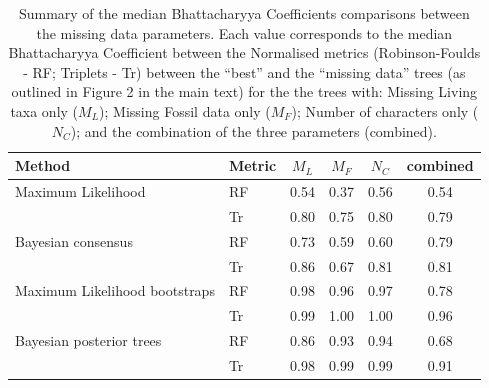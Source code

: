 \documentclass[12pt,letterpaper]{article}
\begin{document}
\begin{table}[ht]
\caption{Summary of the median Bhattacharyya Coefficients comparisons between the missing data parameters. Each value corresponds to the median Bhattacharyya Coefficient between the Normalised metrics (Robinson-Foulds - RF; Triplets - Tr) between the ``best'' and the ``missing data'' trees (as outlined in Figure 2 in the main text) for the the trees with: Missing Living taxa only ($M_L$); Missing Fossil data only ($M_F$); Number of characters only ($N_C$); and the combination of the three parameters (combined).} 
\begin{tabular}{llcccc}  
  \hline
 Method & Metric & $M_L$ & $M_F$ & $N_C$ & combined \\ 
  \hline
Maximum Likelihood & RF & 0.54 & 0.37 & 0.56 & 0.54 \\ 
                   & Tr & 0.80 & 0.75 & 0.80 & 0.79 \\ 
Bayesian consensus & RF & 0.73 & 0.59 & 0.60 & 0.79 \\ 
   & Tr & 0.86 & 0.67 & 0.81 & 0.81 \\ 
Maximum Likelihood bootstraps & RF & 0.98 & 0.96 & 0.97 & 0.78 \\ 
   & Tr & 0.99 & 1.00 & 1.00 & 0.96 \\ 
Bayesian posterior trees & RF & 0.86 & 0.93 & 0.94 & 0.68 \\ 
  & Tr & 0.98 & 0.99 & 0.99 & 0.91 \\ 
 \hline
\end{tabular}
\end{table}
\end{document}
